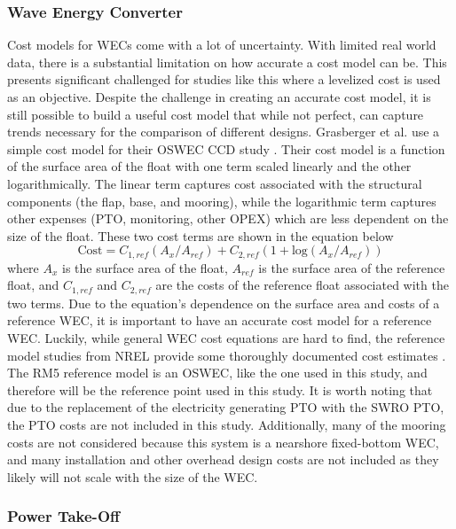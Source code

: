 \documentclass[twocolumn,10pt]{asme2e}
\begin{document}
\subsubsection{Wave Energy Converter}

Cost models for WECs come with a lot of uncertainty. With limited real world data, there is a substantial limitation on how accurate a cost model can be. This presents significant challenged for studies like this where a levelized cost is used as an objective. Despite the challenge in creating an accurate cost model, it is still possible to build a useful cost model that while not perfect, can capture trends necessary for the comparison of different designs. Grasberger et al. use a simple cost model for their OSWEC CCD study \cite{Grasberger2024}. Their cost model is a function of the surface area of the float with one term scaled linearly and the other logarithmically. The linear term captures cost associated with the structural components (the flap, base, and mooring), while the logarithmic term captures other expenses (PTO, monitoring, other OPEX) which are less dependent on the size of the float. These two cost terms are shown in the equation below
\begin{equation}
    \text{Cost} = C_{1,ref}(A_{x}/A_{ref}) + C_{2,ref}(1 + \text{log}(A_{x}/A_{ref}))
\end{equation}
where $A_{x}$ is the surface area of the float, $A_{ref}$ is the surface area of the reference float, and $C_{1,ref}$ and $C_{2,ref}$ are the costs of the reference float associated with the two terms. Due to the equation's dependence on the surface area and costs of a reference WEC, it is important to have an accurate cost model for a reference WEC. Luckily, while general WEC cost equations are hard to find, the reference model studies from NREL provide some thoroughly documented cost estimates \cite{rm5}. The RM5 reference model is an OSWEC, like the one used in this study, and therefore will be the reference point used in this study. It is worth noting that due to the replacement of the electricity generating PTO with the SWRO PTO, the PTO costs are not included in this study. Additionally, many of the mooring costs are not considered because this system is a nearshore fixed-bottom WEC, and many installation and other overhead design costs are not included as they likely will not scale with the size of the WEC.

\subsubsection{Power Take-Off}
\end{document}
